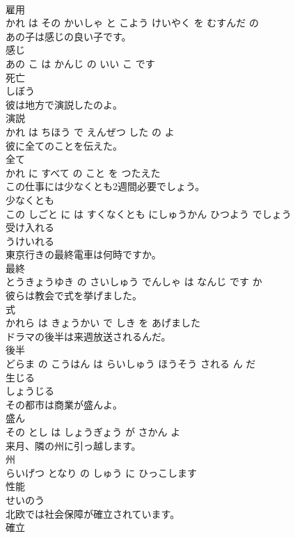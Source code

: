 \documentclass[8pt]{extreport}
\begin{document}
\begin{CJK}{UTF8}{min}
\\	雇用 
\\	かれ は その かいしゃ と こよう けいやく を むすんだ の			
\\	あの子は感じの良い子です。	
\\	感じ 
\\	あの こ は かんじ の いい こ です			
\\	死亡	
\\	しぼう			
\\	彼は地方で演説したのよ。	
\\	演説 
\\	かれ は ちほう で えんぜつ した の よ			
\\	彼に全てのことを伝えた。	
\\	全て 
\\	かれ に すべて の こと を つたえた			
\\	この仕事には少なくとも2週間必要でしょう。	
\\	少なくとも 
\\	この しごと に は すくなくとも にしゅうかん ひつよう でしょう			
\\	受け入れる	
\\	うけいれる			
\\	東京行きの最終電車は何時ですか。	
\\	最終 
\\	とうきょうゆき の さいしゅう でんしゃ は なんじ です か			
\\	彼らは教会で式を挙げました。	
\\	式 
\\	かれら は きょうかい で しき を あげました			
\\	ドラマの後半は来週放送されるんだ。	
\\	後半 
\\	どらま の こうはん は らいしゅう ほうそう される ん だ			
\\	生じる	
\\	しょうじる			
\\	その都市は商業が盛んよ。	
\\	盛ん 
\\	その とし は しょうぎょう が さかん よ			
\\	来月、隣の州に引っ越します。	
\\	州 
\\	らいげつ となり の しゅう に ひっこします			
\\	性能	
\\	せいのう			
\\	北欧では社会保障が確立されています。	
\\	確立 

\end{CJK}
\end{document}

